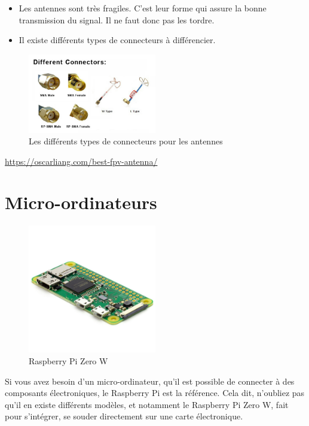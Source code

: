 \documentclass[a4paper, 11pt]{report}
\begin{document}
\begin{itemize}
\item Les antennes sont très fragiles. C'est leur forme qui assure la bonne transmission du signal. Il ne faut donc pas les tordre.
\item Il existe différents types de connecteurs à différencier.
\end{itemize}

\begin{figure}[h]
	\begin{center}
		\includegraphics[width=0.5\textwidth]{images/connecteur_antenne.jpg}
		\caption{Les différents types de connecteurs pour les antennes}
	\end{center}
\end{figure}


\url{https://oscarliang.com/best-fpv-antenna/}

\section{Micro-ordinateurs}

\begin{figure}[h]
\caption{Raspberry Pi Zero W}

\centering{}\includegraphics[width=0.5\textwidth]{images/raspberry_pi_zero_w.jpeg}
\end{figure}

Si vous avez besoin d'un micro-ordinateur, qu'il est possible de connecter
à des composants électroniques, le Raspberry Pi est la référence.
Cela dit, n'oubliez pas qu'il en existe différents modèles, et notamment
le Raspberry Pi Zero W, fait pour s'intégrer, se souder directement
sur une carte électronique.
\end{document}
